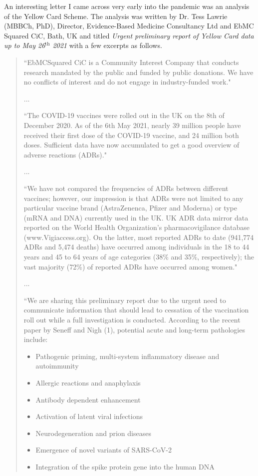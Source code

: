 \documentclass[10pt, a4paper, twocolumn]{book}
\begin{document}
An interesting letter I came across very early into the pandemic was an analysis of the Yellow Card Scheme. The analysis was written by Dr. Tess Lawrie (MBBCh, PhD), Director, Evidence-Based Medicine Consultancy Ltd and EbMC Squared CiC, Bath, UK and titled \textit{Urgent preliminary report of Yellow Card data up to May 26$^\text{th}$ 2021} \citep{YellowCard} with a few excerpts as follows.

\begin{quotation}
	``EbMCSquared CiC is a Community Interest Company that conducts research mandated by the public and funded by public donations. We have no conflicts of interest and do not engage in industry-funded work."
	
	...
	
	``The COVID-19 vaccines were rolled out in the UK on the 8$\text{th}$ of December 2020. As of the 6$\text{th}$ May 2021, nearly 39 million people have received their first dose of the COVID-19 vaccine, and 24 million both doses. Sufficient data have now accumulated to get a good overview of adverse reactions (ADRs)."
	
	...
	
	``We have not compared the frequencies of ADRs between different vaccines; however, our impression is that ADRs were not limited to any particular vaccine brand (AstraZenenca, Pfizer and Moderna) or type (mRNA and DNA) currently used in the UK. UK ADR data mirror data reported on the World Health Organization’s pharmacovigilance database (www.Vigiaccess.org). On the latter, most reported ADRs to date (941,774 ADRs and 5,474 deaths) have occurred among individuals in the 18 to 44 years and 45 to 64 years of age categories (38\% and 35\%, respectively); the vast majority (72\%) of reported ADRs have occurred among women."
	
	...
	
	``We are sharing this preliminary report due to the urgent need to communicate information that should lead to cessation of the vaccination roll out while a full investigation is conducted. According to the recent paper by Seneff and Nigh (1), potential acute and long-term pathologies include:
	
\begin{itemize}
	\item Pathogenic priming, multi-system inflammatory disease and autoimmunity
	\item Allergic reactions and anaphylaxis
	\item Antibody dependent enhancement
	\item Activation of latent viral infections
	\item Neurodegeneration and prion diseases
	\item Emergence of novel variants of SARS-CoV-2
	\item Integration of the spike protein gene into the human DNA
\end{itemize}
	

\end{quotation}
\end{document}
